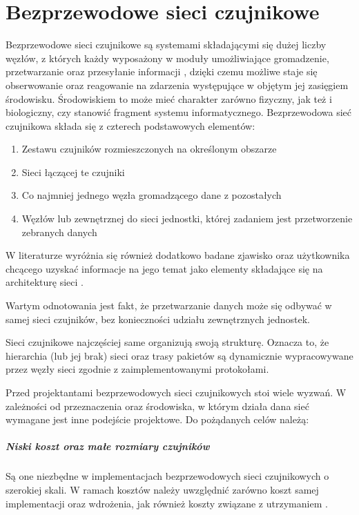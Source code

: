 \chapter{Bezprzewodowe sieci czujnikowe}
Bezprzewodowe sieci czujnikowe są systemami składającymi się dużej liczby węzłów, z których każdy wyposażony w moduły umożliwiające gromadzenie, przetwarzanie oraz przesyłanie informacji \cite{Ilyas2004}, dzięki czemu możliwe staje się obserwowanie oraz reagowanie na zdarzenia występujące w objętym jej zasięgiem środowisku. Środowiskiem to może mieć charakter zarówno fizyczny, jak też i biologiczny, czy stanowić fragment systemu informatycznego. 
\cite{Sohraby2006}
Bezprzewodowa sieć czujnikowa składa się z czterech podstawowych elementów\cite{Karl2006}:
\begin{enumerate}
	\item Zestawu czujników rozmieszczonych na określonym obszarze
	\item Sieci łączącej te czujniki
	\item Co najmniej jednego węzła gromadzącego dane z pozostałych
	\item Węzłów lub zewnętrznej do sieci jednostki, której zadaniem jest przetworzenie zebranych danych
\end{enumerate}
W literaturze wyróżnia się również dodatkowo badane zjawisko oraz użytkownika chcącego uzyskać informacje na jego temat jako elementy składające się na architekturę sieci \cite{Tilak2002}.

Wartym odnotowania jest fakt, że przetwarzanie danych może się odbywać w samej sieci czujników, bez konieczności udziału zewnętrznych jednostek.

Sieci czujnikowe najczęściej same organizują swoją strukturę. Oznacza to, że hierarchia (lub jej brak) sieci oraz trasy pakietów są dynamicznie wypracowywane przez węzły sieci zgodnie z zaimplementowanymi protokołami.

Przed projektantami bezprzewodowych sieci czujnikowych stoi wiele wyzwań. W zależności od przeznaczenia oraz środowiska, w którym działa dana sieć wymagane jest inne podejście projektowe. Do pożądanych celów należą:
\paragraph{Niski koszt oraz małe rozmiary czujników}
Są one niezbędne w implementacjach bezprzewodowych sieci czujnikowych o szerokiej skali. W ramach kosztów należy uwzględnić zarówno koszt samej implementacji oraz wdrożenia, jak również koszty związane z utrzymaniem \cite{Howitt2006}.


